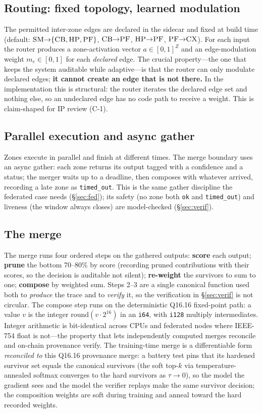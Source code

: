 \documentclass[11pt]{article}
\newcommand{\zone}[1]{\textsc{#1}}
\newcommand{\Qff}{Q16.16}
\begin{document}
\subsection{Routing: fixed topology, learned modulation}
The permitted inter-zone edges are declared in the sidecar and fixed at build time (default:
$\zone{SM}{\to}\{\zone{CB},\zone{HP},\zone{PF}\}$, $\zone{CB}{\to}\zone{PF}$, $\zone{HP}{\to}\zone{PF}$,
$\zone{PF}{\to}\zone{CX}$). For each input the router produces a zone-activation vector
$a\in[0,1]^{Z}$ and an edge-modulation weight $m_e\in[0,1]$ for each \emph{declared} edge. The crucial
property---the one that keeps the system auditable while adaptive---is that the router can only
modulate declared edges; \textbf{it cannot create an edge that is not there.} In the implementation
this is structural: the router iterates the declared edge set and nothing else, so an undeclared edge
has no code path to receive a weight. This is claim-shaped for IP review (C-1).

\subsection{Parallel execution and async gather}
Zones execute in parallel and finish at different times. The merge boundary uses an async gather:
each zone returns its output tagged with a confidence and a status; the merger waits up to a deadline,
then composes with whatever arrived, recording a late zone as \texttt{timed\_out}. This is the same
gather discipline the federated case needs (\S\ref{sec:fed}); its safety (no zone both \texttt{ok}
and \texttt{timed\_out}) and liveness (the window always closes) are model-checked
(\S\ref{sec:verif}).

\subsection{The merge}
The merge runs four ordered steps on the gathered outputs: \textbf{score} each output; \textbf{prune}
the bottom 70--80\% by score (recording pruned contributions with their scores, so the decision is
auditable not silent); \textbf{re-weight} the survivors to sum to one; \textbf{compose} by weighted
sum. Steps 2--3 are a single canonical function used both to \emph{produce} the trace and to
\emph{verify} it, so the verification in \S\ref{sec:verif} is not circular. The compose step runs on
the deterministic \Qff{} fixed-point path: a value $v$ is the integer $\mathrm{round}(v\cdot 2^{16})$
in an \texttt{i64}, with \texttt{i128} multiply intermediates. Integer arithmetic is bit-identical
across CPUs and federated nodes where IEEE-754 float is not---the property that lets independently
computed merges reconcile and on-chain provenance verify. The training-time merge is a differentiable
form \emph{reconciled to} this \Qff{} provenance merge: a battery test pins that its hardened survivor
set equals the canonical survivors (the soft top-$k$ via temperature-annealed softmax converges to
the hard survivors as $\tau\to 0$), so the model the gradient sees and the model the verifier replays
make the same survivor decision; the composition weights are soft during training and anneal toward
the hard recorded weights.
\end{document}

